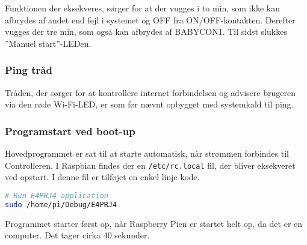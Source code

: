 Funktionen der eksekveres, sørger for at der vugges i to min, som ikke kan afbrydes af andet end fejl i systemet og OFF fra ON/OFF-kontakten. Derefter vugges der tre min, som også kan afbrydes af BABYCON1. Til sidst slukkes ''Manuel start''-LEDen.


\subsubsection*{Ping tråd}

Tråden, der sørger for at kontrollere internet forbindelsen og advisere brugeren via den røde Wi-Fi-LED, er som før nævnt opbygget med systemkald til ping. 


\subsubsection*{Programstart ved boot-up}

Hovedprogrammet er sat til at starte automatisk, når strømmen forbindes til Controlleren. I Raspbian findes der en \verb+/etc/rc.local+ fil, der bliver eksekveret ved opstart. I denne fil er tilføjet en enkel linje kode.

\begin{lstlisting}[language=sh]
# Run E4PRJ4 application
sudo /home/pi/Debug/E4PRJ4
\end{lstlisting}

Programmet starter først op, når Raspberry Pien er startet helt op, da det er en computer. Det tager cirka 40 sekunder.